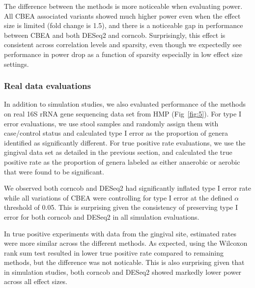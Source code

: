 \documentclass[10pt,letterpaper]{article}
\begin{document}
The difference between the methods is more noticeable when evaluating power. All CBEA associated variants showed much higher power even when the effect size is limited (fold change is 1.5), and there is a noticeable gap in performance between CBEA and both DESeq2 and corncob. Surprisingly, this effect is consistent across correlation levels and sparsity, even though we expectedly see performance in power drop as a function of sparsity especially in low effect size settings.  

\subsubsection*{Real data evaluations}
In addition to simulation studies, we also evaluated performance of the methods on real 16S rRNA gene sequencing data set from HMP (Fig~\ref{fig:5}). For type I error evaluations, we use stool samples and randomly assign them with case/control status and calculated type I error as the proportion of genera identified as significantly different. For true positive rate evaluations, we use the gingival data set as detailed in the previous section, and calculated the true positive rate as the proportion of genera labeled as either anaerobic or aerobic that were found to be significant.   

We observed both corncob and DESeq2 had significantly inflated type I error rate while all variations of CBEA were controlling for type I error at the defined $\alpha$ threshold of 0.05. This is surprising given the consistency of preserving type I error for both corncob and DESeq2 in all simulation evaluations. 

In true positive experiments with data from the gingival site, estimated rates were more similar across the different methods. As expected, using the Wilcoxon rank sum test resulted in lower true positive rate compared to remaining methods, but the difference was not noticable. This is also surprising given that in simulation studies, both corncob and DESeq2 showed markedly lower power across all effect sizes.  
\end{document}
